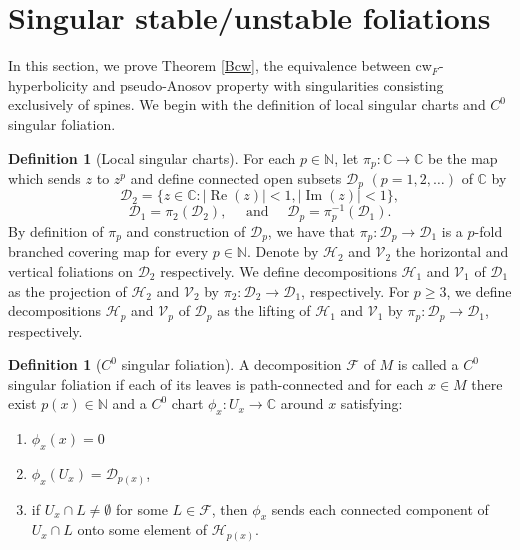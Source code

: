 \documentclass{amsart}
\theoremstyle{plain}
\theoremstyle{definition}
\newtheorem{definition}[theorem]{Definition}
\newcommand{\im}{\operatorname{Im}}
\newcommand{\rea}{\operatorname{Re}}
\newcommand{\C}{\mathbb{C}}
\newcommand{\mc}{\mathcal}
\newcommand{\N}{\mathbb{N}}
\begin{document}


\section{Singular stable/unstable foliations}

In this section, we prove  Theorem \ref{Bcw}, the equivalence between cw$_F$-hyperbolicity and pseudo-Anosov property with singularities consisting exclusively of spines.
We begin with the definition of local singular charts and $C^0$ singular foliation. 

\begin{definition}[Local singular charts] For each $p\in \N$, let $\pi_p:\C \to \C$ be the map which sends $z$ to $z^p$ and define connected open subsets $\mc{D}_p$ $(p=1,2,\ldots)$ of $\C$ by $$\mc{D}_2=\{z\in \C : |\rea(z)|<1 ,|\im(z)|<1\},$$ $$\mc{D}_1=\pi_2(\mc{D}_2), \quad \text{ and } \quad \mc{D}_p = \pi_p^{-1}(\mc{D}_1).$$ 
By definition of $\pi_p$ and construction of $\mc{D}_p$, we have that $\pi_p:\mc{D}_p\to \mc{D}_1$ is a $p$-fold branched covering map for every $p\in \N$. 
Denote by $\mc{H}_2$ and $\mc{V}_2$ the horizontal and vertical foliations on $\mc{D}_2$ respectively. We define decompositions $\mc{H}_1$ and $\mc{V}_1$ of $\mc{D}_1$ as the projection of $\mc{H}_2$ and $\mc{V}_2$ by $\pi_2:\mc{D}_2\to \mc{D}_1$, respectively. For $p\geq 3$, we define decompositions $\mc{H}_p$ and $\mc{V}_p$ of $\mc{D}_p$ as the lifting of $\mc{H}_1$ and $\mc{V}_1$ by $\pi_p:\mc{D}_p\to \mc{D}_1$, respectively.
\end{definition}

\begin{definition}[$C^0$ singular foliation]\label{singfol}
A decomposition $\mc{F}$ of $M$ is called a $C^0$ singular foliation if each of its leaves is path-connected and for each $x\in M$ there exist $p(x)\in\N$ and a $C^0$ chart $\phi_x\colon U_x\to\C$ around $x$ satisfying:
\begin{enumerate}
    \item $\phi_x(x)=0$
    \item $\phi_x(U_x)=\mc{D}_{p(x)}$,
    \item if $U_x\cap L\neq \emptyset$ for some $L\in\mc{F}$, then $\phi_x$ sends each connected component of $U_x\cap L$ onto some element of $\mc{H}_{p(x)}$.
\end{enumerate}
\end{definition}
\end{document}
